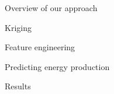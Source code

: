 \documentclass[handout]{beamer}
\begin{document}

\begin{frame}{Overview of our approach}

\end{frame}



\begin{frame}{Kriging}

\end{frame}



\begin{frame}{Feature engineering}

\end{frame}



\begin{frame}{Predicting energy production}

\end{frame}



\begin{frame}{Results}

\end{frame}
\end{document}
